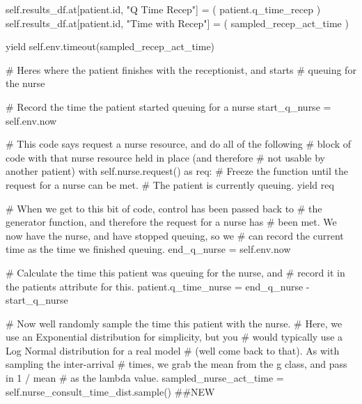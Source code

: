 \documentclass[
  letterpaper,
  DIV=11,
  numbers=noendperiod]{scrreprt}
\newenvironment{Shaded}{\begin{snugshade}}{\end{snugshade}}
\newcommand{\BuiltInTok}[1]{\textcolor[rgb]{0.00,0.23,0.31}{#1}}
\newcommand{\CommentTok}[1]{\textcolor[rgb]{0.37,0.37,0.37}{#1}}
\newcommand{\ControlFlowTok}[1]{\textcolor[rgb]{0.00,0.23,0.31}{#1}}
\newcommand{\ImportTok}[1]{\textcolor[rgb]{0.00,0.46,0.62}{#1}}
\newcommand{\NormalTok}[1]{\textcolor[rgb]{0.00,0.23,0.31}{#1}}
\newcommand{\OperatorTok}[1]{\textcolor[rgb]{0.37,0.37,0.37}{#1}}
\newcommand{\StringTok}[1]{\textcolor[rgb]{0.13,0.47,0.30}{#1}}
\newcommand{\VariableTok}[1]{\textcolor[rgb]{0.07,0.07,0.07}{#1}}
\begin{document}
\begin{tcolorbox}
\begin{Shaded}
\begin{Highlighting}[]
            \VariableTok{self}\NormalTok{.results\_df.at[patient.}\BuiltInTok{id}\NormalTok{, }\StringTok{"Q Time Recep"}\NormalTok{] }\OperatorTok{=}\NormalTok{ (}
\NormalTok{                 patient.q\_time\_recep}
\NormalTok{            )}
            \VariableTok{self}\NormalTok{.results\_df.at[patient.}\BuiltInTok{id}\NormalTok{, }\StringTok{"Time with Recep"}\NormalTok{] }\OperatorTok{=}\NormalTok{ (}
\NormalTok{                 sampled\_recep\_act\_time}
\NormalTok{            )}

            \ControlFlowTok{yield} \VariableTok{self}\NormalTok{.env.timeout(sampled\_recep\_act\_time)}

        \CommentTok{\# Here\textquotesingle{}s where the patient finishes with the receptionist, and starts}
        \CommentTok{\# queuing for the nurse}

        \CommentTok{\# Record the time the patient started queuing for a nurse}
\NormalTok{        start\_q\_nurse }\OperatorTok{=} \VariableTok{self}\NormalTok{.env.now}

        \CommentTok{\# This code says request a nurse resource, and do all of the following}
        \CommentTok{\# block of code with that nurse resource held in place (and therefore}
        \CommentTok{\# not usable by another patient)}
        \ControlFlowTok{with} \VariableTok{self}\NormalTok{.nurse.request() }\ImportTok{as}\NormalTok{ req:}
            \CommentTok{\# Freeze the function until the request for a nurse can be met.}
            \CommentTok{\# The patient is currently queuing.}
            \ControlFlowTok{yield}\NormalTok{ req}

            \CommentTok{\# When we get to this bit of code, control has been passed back to}
            \CommentTok{\# the generator function, and therefore the request for a nurse has}
            \CommentTok{\# been met.  We now have the nurse, and have stopped queuing, so we}
            \CommentTok{\# can record the current time as the time we finished queuing.}
\NormalTok{            end\_q\_nurse }\OperatorTok{=} \VariableTok{self}\NormalTok{.env.now}

            \CommentTok{\# Calculate the time this patient was queuing for the nurse, and}
            \CommentTok{\# record it in the patient\textquotesingle{}s attribute for this.}
\NormalTok{            patient.q\_time\_nurse }\OperatorTok{=}\NormalTok{ end\_q\_nurse }\OperatorTok{{-}}\NormalTok{ start\_q\_nurse}

            \CommentTok{\# Now we\textquotesingle{}ll randomly sample the time this patient with the nurse.}
            \CommentTok{\# Here, we use an Exponential distribution for simplicity, but you}
            \CommentTok{\# would typically use a Log Normal distribution for a real model}
            \CommentTok{\# (we\textquotesingle{}ll come back to that).  As with sampling the inter{-}arrival}
            \CommentTok{\# times, we grab the mean from the g class, and pass in 1 / mean}
            \CommentTok{\# as the lambda value.}
\NormalTok{            sampled\_nurse\_act\_time }\OperatorTok{=} \VariableTok{self}\NormalTok{.nurse\_consult\_time\_dist.sample() }\CommentTok{\#\#NEW}


\end{Highlighting}
\end{Shaded}
\end{tcolorbox}
\end{document}
